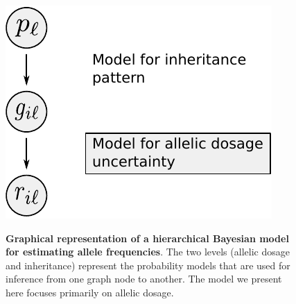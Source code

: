 \documentclass[11pt,english,letterpaper,oneside]{article}
\begin{document}
\begin{figure}
\centering
\caption{\textbf{Graphical representation of a hierarchical Bayesian model for estimating allele frequencies}. The two levels (allelic dosage and inheritance) represent the probability models that are used for inference from one graph node to another. The model we present here focuses primarily on allelic dosage.}
\vspace{0.25in}
\includegraphics{fig/figure1-model-graph}
\label{fig:model-graph}
\end{figure}
\end{document}
